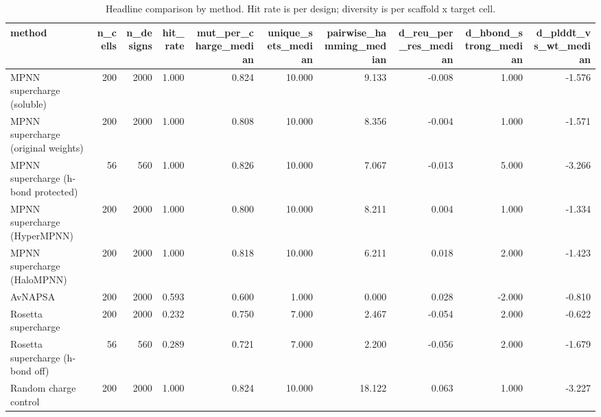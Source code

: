 \begin{table}
\caption{Headline comparison by method. Hit rate is per design; diversity is per scaffold x target cell.}
\label{tab:T2_headline_comparison}
\begin{tabular}{lrrrrrrrrr}
\toprule
method & n\_cells & n\_designs & hit\_rate & mut\_per\_charge\_median & unique\_sets\_median & pairwise\_hamming\_median & d\_reu\_per\_res\_median & d\_hbond\_strong\_median & d\_plddt\_vs\_wt\_median \\
\midrule
MPNN supercharge (soluble) & 200 & 2000 & 1.000 & 0.824 & 10.000 & 9.133 & -0.008 & 1.000 & -1.576 \\
MPNN supercharge (original weights) & 200 & 2000 & 1.000 & 0.808 & 10.000 & 8.356 & -0.004 & 1.000 & -1.571 \\
MPNN supercharge (h-bond protected) & 56 & 560 & 1.000 & 0.826 & 10.000 & 7.067 & -0.013 & 5.000 & -3.266 \\
MPNN supercharge (HyperMPNN) & 200 & 2000 & 1.000 & 0.800 & 10.000 & 8.211 & 0.004 & 1.000 & -1.334 \\
MPNN supercharge (HaloMPNN) & 200 & 2000 & 1.000 & 0.818 & 10.000 & 6.211 & 0.018 & 2.000 & -1.423 \\
AvNAPSA & 200 & 2000 & 0.593 & 0.600 & 1.000 & 0.000 & 0.028 & -2.000 & -0.810 \\
Rosetta supercharge & 200 & 2000 & 0.232 & 0.750 & 7.000 & 2.467 & -0.054 & 2.000 & -0.622 \\
Rosetta supercharge (h-bond off) & 56 & 560 & 0.289 & 0.721 & 7.000 & 2.200 & -0.056 & 2.000 & -1.679 \\
Random charge control & 200 & 2000 & 1.000 & 0.824 & 10.000 & 18.122 & 0.063 & 1.000 & -3.227 \\
\bottomrule
\end{tabular}
\end{table}
